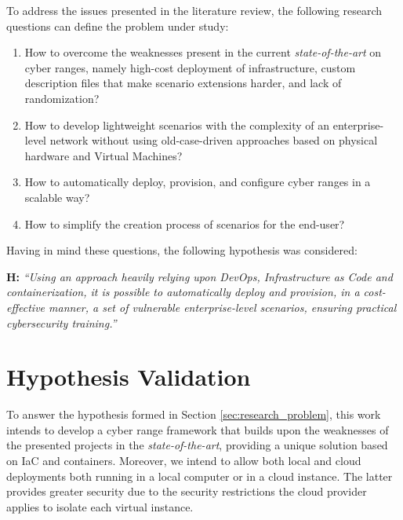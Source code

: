 To address the issues presented in the literature review, the following research questions can define the problem under study:

\begin{enumerate}
    \item How to overcome the weaknesses present in the current \textit{state-of-the-art} on cyber ranges, namely high-cost deployment of infrastructure, custom description files that make scenario extensions harder, and lack of randomization? 
    \item How to develop lightweight scenarios with the complexity of an enterprise-level network without using old-case-driven approaches based on physical hardware and Virtual Machines?
    \item How to automatically deploy, provision, and configure cyber ranges in a scalable way?
    \item How to simplify the creation process of scenarios for the end-user?
\end{enumerate}

Having in mind these questions, the following hypothesis was considered:\\

\leftskip=1.25cm\rightskip=1.25cm

\textbf{H:} \textit{``Using an approach heavily relying upon DevOps, Infrastructure as Code and containerization, it is possible to automatically deploy and provision, in a cost-effective manner, a set of vulnerable enterprise-level scenarios, ensuring practical cybersecurity training.''}

\leftskip=0cm\rightskip=0cm

\section{Hypothesis Validation} \label{sec:hypothesis_validation}

To answer the hypothesis formed in Section \ref{sec:research_problem}, this work intends to develop a cyber range framework that builds upon the weaknesses of the presented projects in the \textit{state-of-the-art}, providing a unique solution based on IaC and containers. Moreover, we intend to allow both local and cloud deployments both running in a local computer or in a cloud instance. The latter provides greater security due to the security restrictions the cloud provider applies to isolate each virtual instance.  

